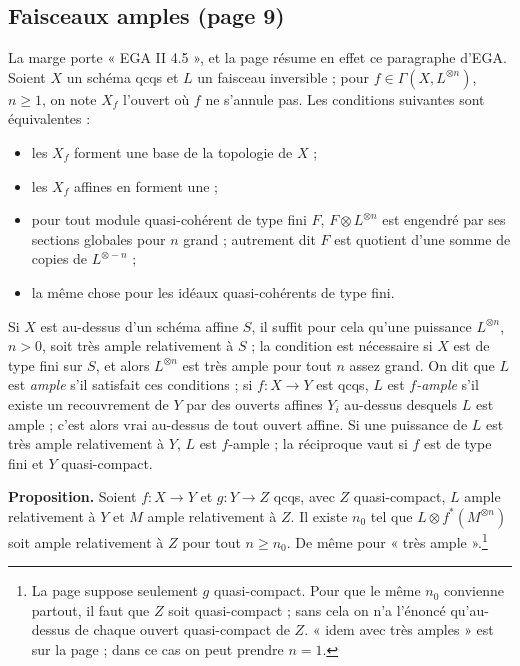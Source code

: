 \documentclass[11pt,a4paper]{article}
\begin{document}
\subsection*{Faisceaux amples (page 9)}

La marge porte « EGA II 4.5 », et la page résume en effet ce paragraphe
d'EGA. Soient $X$ un schéma qcqs et $L$ un faisceau inversible ; pour
$f \in \Gamma(X, L^{\otimes n})$, $n \geqslant 1$, on note $X_f$ l'ouvert où
$f$ ne s'annule pas. Les conditions suivantes sont équivalentes :

\begin{itemize}
  \item[(a)] les $X_f$ forment une base de la topologie de $X$ ;
  \item[(a')] les $X_f$ affines en forment une ;
  \item[(b)] pour tout module quasi-cohérent de type fini $F$,
  $F \otimes L^{\otimes n}$ est engendré par ses sections globales pour $n$
  grand ; autrement dit $F$ est quotient d'une somme de copies de
  $L^{\otimes -n}$ ;
  \item[(b')] la même chose pour les idéaux quasi-cohérents de type fini.
\end{itemize}

Si $X$ est au-dessus d'un schéma affine $S$, il suffit pour cela qu'une
puissance $L^{\otimes n}$, $n > 0$, soit très ample relativement à $S$ ; la
condition est nécessaire si $X$ est de type fini sur $S$, et alors
$L^{\otimes n}$ est très ample pour tout $n$ assez grand. On dit que $L$ est
\emph{ample} s'il satisfait ces conditions ; si $f : X \to Y$ est qcqs, $L$ est
\emph{$f$-ample} s'il existe un recouvrement de $Y$ par des ouverts affines
$Y_i$ au-dessus desquels $L$ est ample ; c'est alors vrai au-dessus de tout
ouvert affine. Si une puissance de $L$ est très ample relativement à $Y$, $L$
est $f$-ample ; la réciproque vaut si $f$ est de type fini et $Y$
quasi-compact.

\textbf{Proposition.} Soient $f : X \to Y$ et $g : Y \to Z$ qcqs, avec $Z$
quasi-compact, $L$ ample relativement à $Y$ et $M$ ample relativement à $Z$.
Il existe $n_0$ tel que $L \otimes f^*(M^{\otimes n})$ soit ample
relativement à $Z$ pour tout $n \geqslant n_0$. De même pour « très
ample ».\footnote{La page suppose seulement $g$ quasi-compact. Pour que le
même $n_0$ convienne partout, il faut que $Z$ soit quasi-compact ; sans cela
on n'a l'énoncé qu'au-dessus de chaque ouvert quasi-compact de $Z$. « idem avec
très amples » est sur la page ; dans ce cas on peut prendre $n = 1$.}
\end{document}
